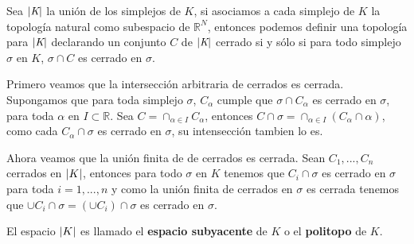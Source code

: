 \begin{Teo}
Sea $\left| \textit{K} \right|$ la unión de los simplejos de $\textit{K}$, si asociamos a cada simplejo de $\textit{K}$ la topología natural como subespacio de $\mathbb{R}^N$, entonces podemos definir una topología para $\left| \textit{K} \right|$ declarando  un conjunto $C$ de  $\left| \textit{K} \right|$ cerrado si y sólo si para todo simplejo $\sigma$ en  $\textit{K}$, $\sigma\cap C$ es cerrado en $\sigma$.
\end{Teo}
\begin{Dem}

Primero veamos que la intersección  arbitraria de cerrados es cerrada. Supongamos que para toda simplejo $\sigma$, $C_{\alpha}$ cumple que $\sigma\cap C_{\alpha}$ es cerrado en $\sigma$, para toda $\alpha$ en $I\subset \mathbb{R}$.
Sea $C = \cap_{\alpha \in I}C_{\alpha}$, entonces $C\cap\sigma = \cap_{\alpha\in I}(C_{\alpha}\cap\alpha)$, como cada $C_{\alpha}\cap \sigma$ es cerrado en $\sigma$, su intensección tambien lo es.

Ahora veamos que la unión finita de de cerrados es cerrada. Sean $C_1,...,C_n$ cerrados en $\left| K \right|$, entonces para todo $\sigma$ en $K$ tenemos que $C_i \cap \sigma$ es cerrado en $\sigma$ para toda $i =1,...,n$ y como la unión finita de cerrados en $\sigma$ es cerrada tenemos que $\cup C_i\cap\sigma = (\cup C_i)\cap\sigma$ es cerrado en $\sigma$.
\end{Dem}
El espacio $\left| K \right|$ es llamado el \textbf{espacio subyacente} de $K$ o el \textbf{politopo} de $K$.

